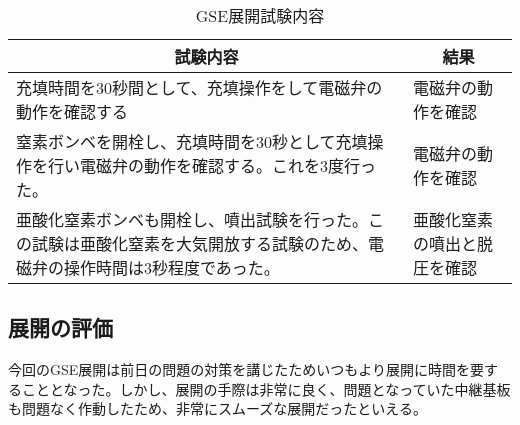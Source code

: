 \documentclass[a4paper,11pt,titlepage,uplatex]{jsarticle}
\begin{document}
\begin{table}[H]
    \centering
    \caption{GSE展開試験内容}
    \begin{tabular}{p{90mm}l} \toprule
        \multicolumn{1}{c}{試験内容}                                        & \multicolumn{1}{c}{結果} \\  \midrule
        充填時間を30秒間として、充填操作をして電磁弁の動作を確認する                                 & 電磁弁の動作を確認              \\
        窒素ボンベを開栓し、充填時間を30秒として充填操作を行い電磁弁の動作を確認する。これを3度行った。               & 電磁弁の動作を確認              \\
        亜酸化窒素ボンベも開栓し、噴出試験を行った。この試験は亜酸化窒素を大気開放する試験のため、電磁弁の操作時間は3秒程度であった。 & 亜酸化窒素の噴出と脱圧を確認         \\
        \bottomrule
    \end{tabular}
    \label{gse_mokuteki}
\end{table}

\subsection{展開の評価}
今回のGSE展開は前日の問題の対策を講じたためいつもより展開に時間を要することとなった。しかし、展開の手際は非常に良く、問題となっていた中継基板も問題なく作動したため、非常にスムーズな展開だったといえる。
\end{document}
